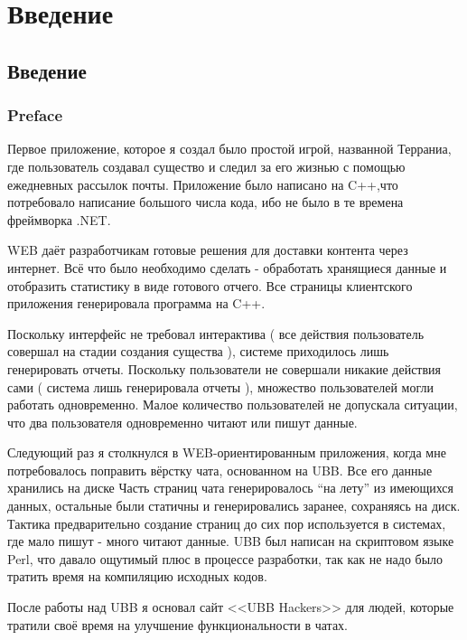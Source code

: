 \chapter{ Введение } \label{chapt1}


\section{ Введение} \label{sect1_1}

\subsection{Preface} \label{subsect1_1_1}

Первое приложение, которое я создал было простой игрой, названной Терраниа, где пользователь создавал существо и следил за его жизнью с помощью ежедневных рассылок почты. Приложение было написано на C++,что потребовало написание большого числа кода, ибо не было в те времена фреймворка .NET.

WEB  даёт разработчикам готовые решения для доставки контента через интернет. Всё что было необходимо сделать - обработать хранящиеся данные и отобразить статистику в виде готового отчего. Все страницы клиентского приложения генерировала программа на C++.

Поскольку интерфейс не требовал интерактива ( все действия пользователь совершал на стадии создания существа ),  системе приходилось лишь генерировать отчеты. Поскольку пользователи не совершали никакие действия сами ( система лишь генерировала отчеты ), множество пользователей могли работать одновременно. Малое количество пользователей не допускала ситуации, что два пользователя одновременно читают или пишут данные.


Следующий раз я столкнулся в WEB-ориентированным приложения, когда мне потребовалось поправить вёрстку чата, основанном на  UBB. Все его данные хранились на диске Часть страниц чата генерировалось ``на лету'' из имеющихся данных, остальные были статичны и генерировались заранее, сохраняясь на диск. Тактика предварительно создание страниц до сих пор используется в системах, где мало пишут - много читают данные. UBB был написан на скриптовом языке Perl, что давало ощутимый плюс в процессе разработки, так как не надо было тратить время на компиляцию исходных кодов.

После работы над UBB я основал сайт <<UBB Hackers>> для людей, которые тратили своё время на улучшение функциональности в чатах. 

